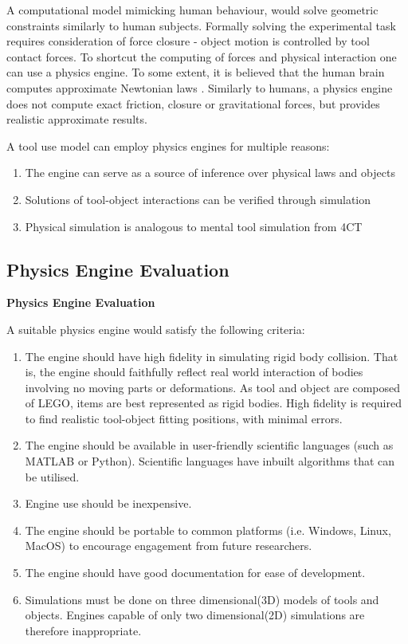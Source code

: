 \documentclass[11]{article}
\let \shorttitle \textbf
\begin{document}
A computational model mimicking human behaviour, would solve geometric constraints similarly to human subjects.
Formally solving the experimental task requires consideration of force closure - object motion is controlled by tool contact forces.
To shortcut the computing of forces and physical interaction one can use a physics engine. 
To some extent, it is believed that the human brain computes approximate Newtonian laws \cite{battaglia2013}. 
Similarly to humans, a physics engine does not compute exact friction, closure or gravitational forces, but provides realistic approximate results. 

A tool use model can employ physics engines for multiple reasons:
\begin{enumerate}
\itemsep0em 
\item The engine can serve as a source of inference over physical laws and objects 
\item Solutions of tool-object interactions can be verified through simulation
\item Physical simulation is analogous to mental tool simulation from 4CT
\end{enumerate}

\subsection{Physics Engine Evaluation}

\shorttitle{Physics Engine Evaluation}

A suitable physics engine would satisfy the following criteria:
\begin{enumerate}
\item The engine should have high fidelity in simulating rigid body collision. 
That is, the engine should faithfully reflect real world interaction of bodies involving no moving parts or deformations.
As tool and object are composed of LEGO, items are best represented as rigid bodies.   
High fidelity is required to find realistic tool-object fitting positions, with minimal errors.
\item The engine should be available in user-friendly scientific languages (such as MATLAB or Python). 
Scientific languages have inbuilt algorithms that can be utilised.
\item Engine use should be inexpensive.
\item The engine should be portable to common platforms (i.e. Windows, Linux, MacOS) to encourage engagement from future researchers.
\item The engine should have good documentation for ease of development.
\item Simulations must be done on three dimensional(3D) models of tools and objects.
Engines capable of only two dimensional(2D) simulations are therefore inappropriate.  
\end{enumerate}
\end{document}
